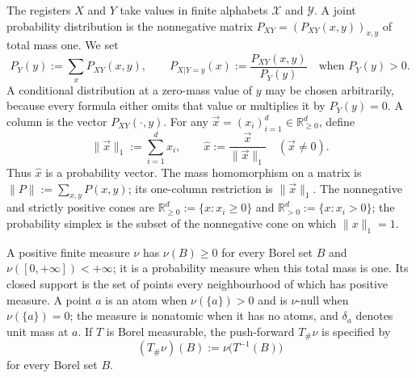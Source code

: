 \documentclass[aps,pra,11pt,onecolumn,nofootinbib,tightenlines]{revtex4-2}
\theoremstyle{definition}
\begin{document}
The registers $X$ and $Y$ take values in finite alphabets $\mathcal X$ and
$\mathcal Y$.  A joint probability distribution is the nonnegative matrix
$P_{XY}=(P_{XY}(x,y))_{x,y}$ of total mass one.  We set
\begin{equation}
 P_Y(y):=\sum_xP_{XY}(x,y),
 \qquad
 P_{X|Y=y}(x):=\frac{P_{XY}(x,y)}{P_Y(y)}
 \quad\text{when }P_Y(y)>0.
 \label{eq:conditional-probability-standing}
\end{equation}
A conditional distribution at a zero-mass value of $y$ may be chosen
arbitrarily, because every formula either omits that value or multiplies it by
$P_Y(y)=0$.  A column is the vector $P_{XY}(\mathord\cdot,y)$.  For any
$\vec x=(x_i)_{i=1}^d\in\mathbb R^d_{\geq0}$, define
\begin{equation}
 \|\vec x\|_1:=\sum_{i=1}^d x_i,
 \qquad
 \widehat x:=\frac{\vec x}{\|\vec x\|_1}\quad(\vec x\neq0).
 \label{eq:l1-normalization-standing}
\end{equation}
Thus $\widehat x$ is a probability vector.  The mass homomorphism on a matrix is
$\|P\|:=\sum_{x,y}P(x,y)$; its one-column restriction is $\|\vec x\|_1$.
The nonnegative and strictly positive cones are
$\mathbb R^d_{\geq0}:=\{x:x_i\geq0\}$ and
$\mathbb R^d_{>0}:=\{x:x_i>0\}$; the probability simplex is the subset of the
nonnegative cone on which $\|x\|_1=1$.

A positive finite measure $\nu$ has $\nu(B)\geq0$ for every Borel set $B$ and
$\nu([0,+\infty])<+\infty$; it is a probability measure when this total mass is
one.  Its closed support is the set of points every neighbourhood of which has
positive measure.  A point $a$ is an atom when $\nu(\{a\})>0$ and is
$\nu$-null when $\nu(\{a\})=0$; the measure is nonatomic when it has no atoms,
and $\delta_a$ denotes unit mass at $a$.  If
$T$ is Borel measurable, the push-forward $T_\#\nu$ is specified by
\begin{equation}
 (T_\#\nu)(B):=\nu\bigl(T^{-1}(B)\bigr)
 \label{eq:pushforward-definition-standing}
\end{equation}
for every Borel set $B$.
\end{document}
